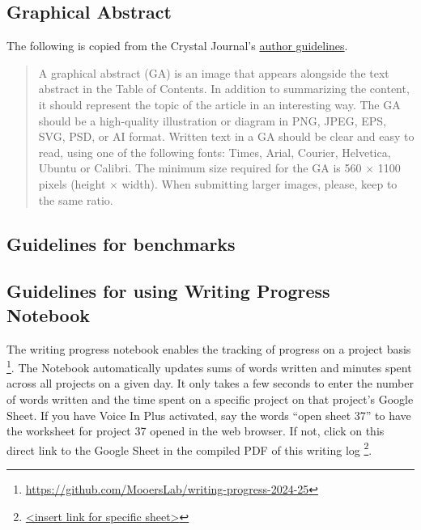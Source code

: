 \documentclass[10pt,letterpaper]{article}
\begin{document}
\subsection{Graphical Abstract}
\label{subsec:guides:graphicalAbstract}


The following is copied from the Crystal Journal's \href{https://www.mdpi.com/journal/crystals/instructions#preparation}{author guidelines}.

\begin{quote}
A graphical abstract (GA) is an image that appears alongside the text abstract in the Table of Contents. 
In addition to summarizing the content, it should represent the topic of the article in an interesting way.
The GA should be a high-quality illustration or diagram in PNG, JPEG, EPS, SVG, PSD, or AI format. 
Written text in a GA should be clear and easy to read, using one of the following fonts: Times, Arial, Courier, Helvetica, Ubuntu or Calibri.
The minimum size required for the GA is 560 $\times$ 1100 pixels (height $\times$ width). 
When submitting larger images, please, keep to the same ratio.
\end{quote}



\subsection{Guidelines for benchmarks}
\label{subsec:guides:benchmarks}


\subsection{Guidelines for using Writing Progress Notebook}
\label{subsec:guides:wpnb}

The writing progress notebook enables the tracking of progress on a project basis \footnote{\url{https://github.com/MooersLab/writing-progress-2024-25}}.
The Notebook automatically updates sums of words written and minutes spent across all projects on a given day.
It only takes a few seconds to enter the number of words written and the time spent on a specific project on that project's Google Sheet. 
If you have Voice In Plus activated, say the words ``open sheet 37'' to have the worksheet for project 37 opened in the web browser.
If not, click on this direct link to the Google Sheet in the compiled PDF of this writing log \footnote{\url{<insert link for specific sheet>}}.
\end{document}

